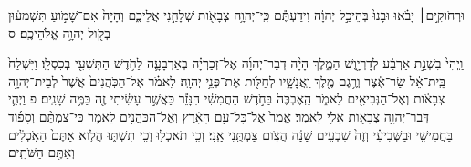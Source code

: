 \documentclass{openreader}
\begin{document}
וּרְחֹוקִ֣ים׀ יָבֹ֗אוּ וּבָנוּ֙ בְּהֵיכַ֣ל יְהוָ֔ה וִידַעְתֶּ֕ם כִּֽי־יְהוָ֥ה צְבָאֹ֖ות שְׁלָחַ֣נִי אֲלֵיכֶ֑ם וְהָיָה֙ אִם־שָׁמֹ֣ועַ תִּשְׁמְע֔וּן בְּקֹ֖ול יְהוָ֥ה אֱלֹהֵיכֶֽם׃ ס 

וַֽיְהִי֙ בִּשְׁנַ֣ת אַרְבַּ֔ע לְדָרְיָ֖וֶשׁ הַמֶּ֑לֶךְ הָיָ֨ה דְבַר־יְהוָ֜ה אֶל־זְכַרְיָ֗ה בְּאַרְבָּעָ֛ה לַחֹ֥דֶשׁ הַתְּשִׁעִ֖י בְּכִסְלֵֽו׃ 
וַיִּשְׁלַח֙ בֵּֽית־אֵ֔ל שַׂר־אֶ֕צֶר וְרֶ֥גֶם מֶ֖לֶךְ וַֽאֲנָשָׁ֑יו לְחַלֹּ֖ות אֶת־פְּנֵ֥י יְהוָֽה׃ 
לֵאמֹ֗ר אֶל־הַכֹּֽהֲנִים֙ אֲשֶׁר֙ לְבֵית־יְהוָ֣ה צְבָאֹ֔ות וְאֶל־הַנְּבִיאִ֖ים לֵאמֹ֑ר הַֽאֶבְכֶּה֙ בַּחֹ֣דֶשׁ הַחֲמִשִׁ֔י הִנָּזֵ֕ר כַּאֲשֶׁ֣ר עָשִׂ֔יתִי זֶ֖ה כַּמֶּ֥ה שָׁנִֽים׃ פ 
וַיְהִ֛י דְּבַר־יְהוָ֥ה צְבָאֹ֖ות אֵלַ֥י לֵאמֹֽר׃ 
אֱמֹר֙ אֶל־כָּל־עַ֣ם הָאָ֔רֶץ וְאֶל־הַכֹּהֲנִ֖ים לֵאמֹ֑ר כִּֽי־צַמְתֶּ֨ם וְסָפֹ֜וד בַּחֲמִישִׁ֣י וּבַשְּׁבִיעִ֗י וְזֶה֙ שִׁבְעִ֣ים שָׁנָ֔ה הֲצֹ֥ום צַמְתֻּ֖נִי אָֽנִי׃ 
וְכִ֥י תֹאכְל֖וּ וְכִ֣י תִשְׁתּ֑וּ הֲלֹ֤וא אַתֶּם֙ הָאֹ֣כְלִ֔ים וְאַתֶּ֖ם הַשֹּׁתִֽים׃ 
\end{document}
